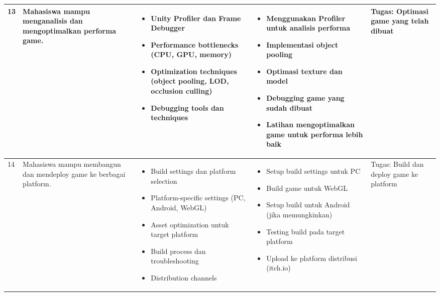 \begin{longtable}{|p{0.8cm}|p{3.5cm}|p{4cm}|p{4cm}|p{2.5cm}|}
13 & Mahasiswa mampu menganalisis dan mengoptimalkan performa game. & 
\begin{itemize}[leftmargin=*,nosep]
\item Unity Profiler dan Frame Debugger
\item Performance bottlenecks (CPU, GPU, memory)
\item Optimization techniques (object pooling, LOD, occlusion culling)
\item Debugging tools dan techniques
\end{itemize} & 
\begin{itemize}[leftmargin=*,nosep]
\item Menggunakan Profiler untuk analisis performa
\item Implementasi object pooling
\item Optimasi texture dan model
\item Debugging game yang sudah dibuat
\item Latihan mengoptimalkan game untuk performa lebih baik
\end{itemize} & 
Tugas: Optimasi game yang telah dibuat \\
\hline

14 & Mahasiswa mampu membangun dan mendeploy game ke berbagai platform. & 
\begin{itemize}[leftmargin=*,nosep]
\item Build settings dan platform selection
\item Platform-specific settings (PC, Android, WebGL)
\item Asset optimization untuk target platform
\item Build process dan troubleshooting
\item Distribution channels
\end{itemize} & 
\begin{itemize}[leftmargin=*,nosep]
\item Setup build settings untuk PC
\item Build game untuk WebGL
\item Setup build untuk Android (jika memungkinkan)
\item Testing build pada target platform
\item Upload ke platform distribusi (itch.io)
\end{itemize} & 
Tugas: Build dan deploy game ke platform \\
\hline


\end{longtable}
